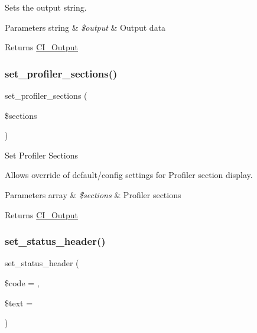Sets the output string.


\begin{DoxyParams}[1]{Parameters}
string & {\em \$output} & Output data \\
\hline
\end{DoxyParams}
\begin{DoxyReturn}{Returns}
\mbox{\hyperlink{class_c_i___output}{C\+I\+\_\+\+Output}} 
\end{DoxyReturn}
\mbox{\label{class_c_i___output_ac5e50de443748cf3d356d29eba2caaaf}} 
\subsubsection{\texorpdfstring{set\+\_\+profiler\+\_\+sections()}{set\_profiler\_sections()}}
{\footnotesize\ttfamily set\+\_\+profiler\+\_\+sections (\begin{DoxyParamCaption}\item[{}]{\$sections }\end{DoxyParamCaption})}

Set Profiler Sections

Allows override of default/config settings for Profiler section display.


\begin{DoxyParams}[1]{Parameters}
array & {\em \$sections} & Profiler sections \\
\hline
\end{DoxyParams}
\begin{DoxyReturn}{Returns}
\mbox{\hyperlink{class_c_i___output}{C\+I\+\_\+\+Output}} 
\end{DoxyReturn}
\mbox{\label{class_c_i___output_a6fa308cb1fadec4938edade0a51eb773}} 
\subsubsection{\texorpdfstring{set\+\_\+status\+\_\+header()}{set\_status\_header()}}
{\footnotesize\ttfamily set\+\_\+status\+\_\+header (\begin{DoxyParamCaption}\item[{}]{\$code = {},  }\item[{}]{\$text = {\ttfamily \textquotesingle{}\textquotesingle{}} }\end{DoxyParamCaption})}

